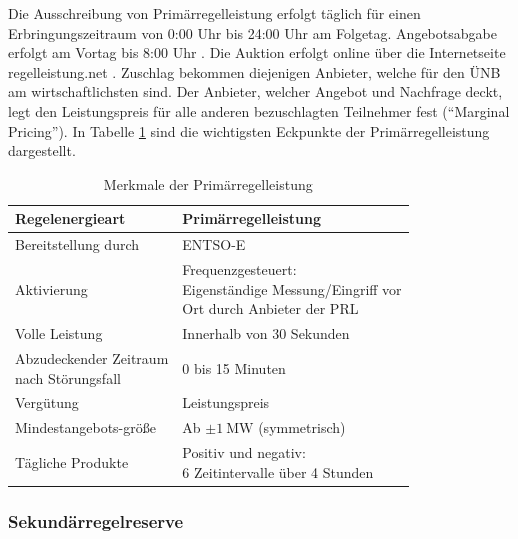 			Die Ausschreibung von Primärregelleistung erfolgt täglich für einen Erbringungszeitraum von 0:00 Uhr bis 24:00 Uhr am Folgetag.
			Angebotsabgabe erfolgt am Vortag bis 8:00 Uhr  \parencite{regelleistungnet_PRL_Ausschreibung}.
			Die Auktion erfolgt online über die Internetseite regelleistung.net \parencite{regelleistungnet_PRL_Ausschreibung}.
			Zuschlag bekommen diejenigen Anbieter, welche für den ÜNB am wirtschaftlichsten sind.
			Der Anbieter, welcher Angebot und Nachfrage deckt, legt den Leistungspreis für alle anderen bezuschlagten Teilnehmer fest ("`Marginal Pricing"').
			In Tabelle \ref{Tab. Merkmale der Primärregellung} sind die wichtigsten Eckpunkte der Primärregelleistung dargestellt.		
		
			\begin{table}[H]
				\centering
				\caption{Merkmale der Primärregelleistung \cite{Regelleistung_NextKraftwerke}}
				\label{Tab. Merkmale der Primärregellung}
				\begin{tabular}{ll}
					\hline
					Regelenergieart & Primärregelleistung  \\ \hline
					Bereitstellung durch & ENTSO-E  \\
					Aktivierung & \makecell[l]{Frequenzgesteuert: \\ Eigenständige Messung/Eingriff vor \\ Ort durch Anbieter der PRL} \\
					Volle Leistung & Innerhalb von 30 Sekunden \\
					\makecell[l]{Abzudeckender Zeitraum \\ nach Störungsfall} & \num{0} bis \num{15} Minuten  \\
					Vergütung & Leistungspreis  \\
					Mindestangebots-größe & Ab $\pm\SI{1}{\mega\watt}$ (symmetrisch) \\
					Tägliche Produkte & \makecell[l]{Positiv und negativ: \\ \num{6} Zeitintervalle über \num{4} Stunden} \\ \hline
				\end{tabular}
			\end{table}
		
		\subsubsection{Sekundärregelreserve}		
			
